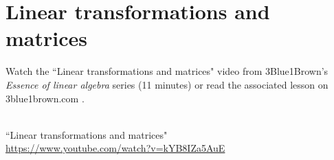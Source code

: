 \section{Linear transformations and matrices}

Watch the ``Linear transformations and matrices" video from 3Blue1Brown's
\textit{Essence of linear algebra} series (11 minutes) or read the associated
lesson on 3blue1brown.com
\cite{bib:3b1b_linalg_linear_transformations_and_matrices}.
\begin{bookfigure}
   \\
  \tiny
  ``Linear transformations and matrices" \\
  \url{https://www.youtube.com/watch?v=kYB8IZa5AuE}
\end{bookfigure}
